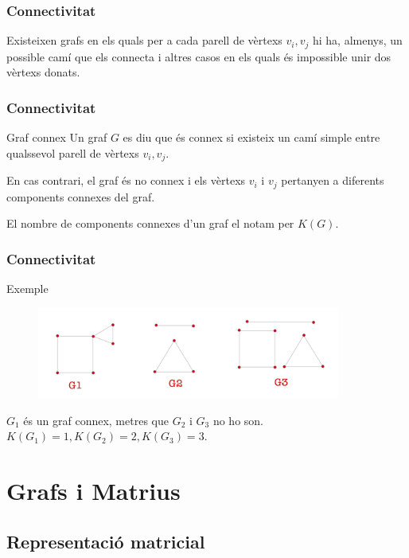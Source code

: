 \documentclass{beamer}
\begin{document}
\begin{frame}
\frametitle{Connectivitat}
Existeixen grafs en els quals per a cada parell de vèrtexs $v_i,v_j$ hi  ha, almenys, un possible camí que els connecta i altres casos en els quals és impossible unir dos vèrtexs donats. 
\end{frame}


\begin{frame}
\frametitle{Connectivitat}
\begin{block}{Graf connex}
Un graf $G$ es diu que és connex si existeix un camí simple entre qualssevol parell de vèrtexs $v_i,v_j$.

En cas contrari, el graf és no connex i els vèrtexs $v_i$ i $v_j$ pertanyen a diferents components connexes del graf.

El nombre de components connexes d'un graf el notam per $K(G)$.
\end{block}
\end{frame}





\begin{frame}
\frametitle{Connectivitat}
\begin{block}{Exemple}

\begin{figure}[h]
 \label{fig:volum}
\centering
\includegraphics[height=3cm]{g8}
\end{figure}

$G_1$ és un graf connex, metres que $G_2$ i $G_3$ no ho son. $K(G_1) = 1, K(G_2) = 2, K(G_3) = 3$.
\end{block}
\end{frame}





\section{Grafs i Matrius}
\subsection{Representació matricial}
\end{document}
